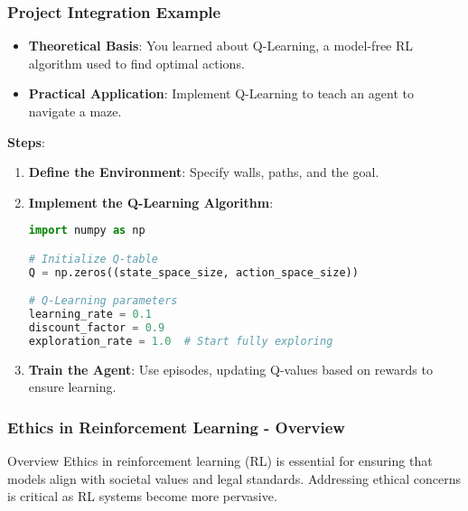 \documentclass[aspectratio=169]{beamer}
\begin{document}
\begin{frame}[fragile]
    \frametitle{Project Integration Example}
    \begin{itemize}
        \item \textbf{Theoretical Basis}: You learned about Q-Learning, a model-free RL algorithm used to find optimal actions.
        \item \textbf{Practical Application}: Implement Q-Learning to teach an agent to navigate a maze.
    \end{itemize}
    \textbf{Steps}:
    \begin{enumerate}
        \item \textbf{Define the Environment}: Specify walls, paths, and the goal.
        \item \textbf{Implement the Q-Learning Algorithm}:
        \begin{lstlisting}[language=Python]
import numpy as np

# Initialize Q-table
Q = np.zeros((state_space_size, action_space_size))

# Q-Learning parameters
learning_rate = 0.1
discount_factor = 0.9
exploration_rate = 1.0  # Start fully exploring
        \end{lstlisting}
        \item \textbf{Train the Agent}: Use episodes, updating Q-values based on rewards to ensure learning.
    \end{enumerate}
\end{frame}

\begin{frame}[fragile]
    \frametitle{Ethics in Reinforcement Learning - Overview}
    \begin{block}{Overview}
        Ethics in reinforcement learning (RL) is essential for ensuring that models align with societal values and legal standards. 
        Addressing ethical concerns is critical as RL systems become more pervasive.
    \end{block}
\end{frame}
\end{document}
